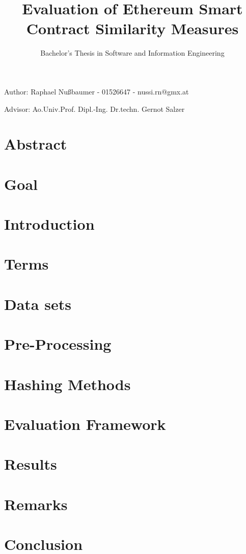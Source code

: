 \documentclass{article}
\title{Evaluation of Ethereum Smart Contract Similarity Measures}
\author{Bachelor's Thesis in Software and Information Engineering}
\date{}
\begin{document}

\maketitle
Author: Raphael Nußbaumer - 01526647 - nussi.rn@gmx.at

Advisor: Ao.Univ.Prof. Dipl.-Ing. Dr.techn. Gernot Salzer

\section{Abstract}


\section{Goal}


\section{Introduction}


\section{Terms}


\section{Data sets}


\section{Pre-Processing}


\section{Hashing Methods}


\section{Evaluation Framework}


\section{Results}


\section{Remarks}


\section{Conclusion}


\printbibliography
\end{document}
